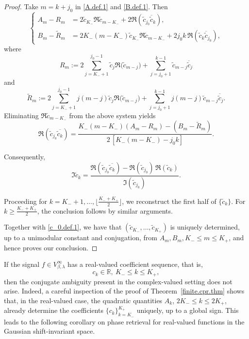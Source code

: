 \documentclass[11pt,oneside,reqno]{amsart}
\numberwithin{equation}{section}
\def\Vbeta{V^\infty_{\beta,\lambda}}
\begin{document}
\begin{proof}
Take $m=k+j_0$ in \eqref{A.def.1} and \eqref{B.def.1}. Then
\[
\left\{
\begin{aligned}
A_m-R_m
&=2\tilde c_{K_-}\Re\tilde c_{m-K_-}
 +2\Re(\tilde c_{j_0}\overline{\tilde c}_k),\\
B_m-\widetilde R_m
&=2K_-(m-K_-)\tilde c_{K_-}\Re\tilde c_{m-K_-}
 +2j_0k\,\Re(\tilde c_k \overline{\tilde c}_{j_0}),
\end{aligned}
\right.
\]
where
\[
R_m:=2\sum_{j=K_-+1}^{j_0-1}{\tilde c}_{j}\Re\big( \tilde c_{m-j}\big)+\sum_{j=j_0+1}^{k-1}{\tilde c}_{m-j}\overline{\tilde c}_{j}\]
and 
\[\widetilde R_m
:=
2\sum_{j=K_-+1}^{j_0-1}j(m-j){\tilde c}_{j}\Re\big( \tilde c_{m-j}\big)+\sum_{j=j_0+1}^{k-1}j(m-j){\tilde c}_{m-j}\overline{\tilde c}_{j}.
\]
Eliminating $\Re\tilde c_{m-K_-}$ from the above system yields
\begin{equation}\label{S3:Reprod}
\Re(\tilde c_{j_0}\overline{\tilde c_k})
=
\frac{K_-(m-K_-)(A_m-R_m)-(B_m-\widetilde R_m)}
     {2\,[K_-(m-K_-)-j_0k]}.
\end{equation}

Consequently,
\begin{equation}\label{S3:Imck}
\Im\tilde c_k
=
\frac{\Re(\tilde c_{j_0}\overline{\tilde c_k})
-\Re(\tilde c_{j_0})\,\Re(\tilde c_k)}
{\Im(\tilde c_{j_0})}.
\end{equation}

\medskip
Proceeding for $k=K_-+1,\ldots,\lfloor\frac{K_-+K_+}{2}\rfloor$, we reconstruct the
first half of $\{\tilde c_k\}$. For $k\ge \frac{K_-+K_+}{2}$, the conclusion follows
by similar arguments.

\smallskip 

 Together with \eqref{c_0.def.1},
we have that $(\tilde c_{K_-},\ldots, \tilde c_{K_+} )$ is uniquely determined, up to a unimodular constant and conjugation, from $A_m, B_m, K_-\le m\le K_+$, and hence proves our conclusion. 
\end{proof}


\medskip


 If the signal $f\in \Vbeta$ has a real-valued coefficient sequence, that is,
\[
c_k \in \mathbb{R}, \  K_- \le k \le K_+ ,
\]
then the conjugate ambiguity present in the complex-valued setting does not arise. Indeed, a careful inspection of the proof of Theorem~\ref{finite.cpr.thm} shows that,
in the real-valued case, the quadratic quantities $A_k$, $2K_- \le k \le 2K_+$,
already determine the coefficients $\{c_k\}_{k=K_-}^{K_+}$ uniquely, up to a global sign. 
This leads to the following corollary on phase retrieval for real-valued functions in the Gaussian shift-invariant space.
\end{document}
